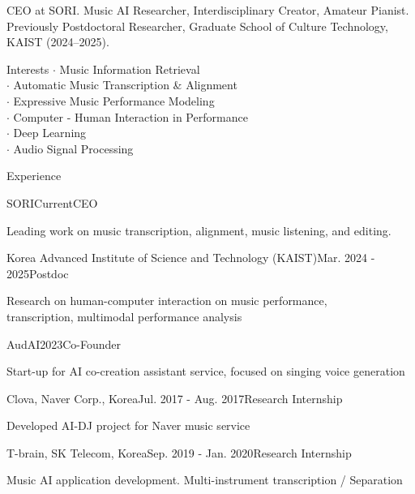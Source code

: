 \documentclass{resume} %
\begin{document}
CEO at SORI. Music AI Researcher, Interdisciplinary Creator, Amateur Pianist.
\\Previously Postdoctoral Researcher, Graduate School of Culture Technology, KAIST (2024--2025).

\begin{rSection}{Interests}
$\cdot$ Music Information Retrieval
\\$\cdot$ Automatic Music Transcription \& Alignment
\\$\cdot$ Expressive Music Performance Modeling
\\$\cdot$ Computer - Human Interaction in Performance
\\$\cdot$ Deep Learning
\\$\cdot$ Audio Signal Processing
\end{rSection}

\begin{rSection}{Experience}
\begin{rSubsection}{SORI}{Current}{CEO}{}
\item Leading work on music transcription, alignment, music listening, and editing.
\end{rSubsection}
\begin{rSubsection}{Korea Advanced Institute of Science and Technology (KAIST)}{Mar. 2024 - 2025}{Postdoc}{}
\item Research on human-computer interaction on music performance,
\\transcription, multimodal performance analysis
\end{rSubsection}
\begin{rSubsection}{AudAI}{2023}{Co-Founder}{}
\item Start-up for AI co-creation assistant service, focused on singing voice generation
\end{rSubsection}
\begin{rSubsection}{Clova, Naver Corp., Korea}{Jul. 2017 - Aug. 2017}{Research Internship}{}
\item Developed AI-DJ project for Naver music service
\end{rSubsection}
\begin{rSubsection}{T-brain, SK Telecom, Korea}{Sep. 2019 - Jan. 2020}{Research Internship}{}
\item Music AI application development. Multi-instrument transcription / Separation

\end{rSubsection}
\end{rSection}
\end{document}
